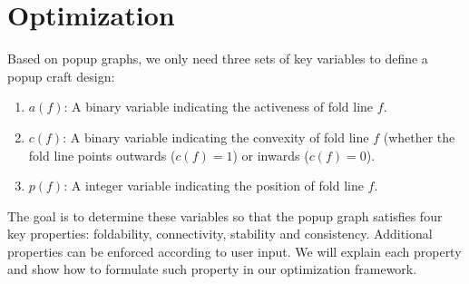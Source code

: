 \section{Optimization}
Based on popup graphs, we only need three sets of key variables to define a popup craft design:
\begin{enumerate}
\item $a(f)$: A binary variable indicating the activeness of fold line $f$.
\item $c(f)$: A binary variable indicating the convexity of fold line $f$ (whether the fold line points outwards ($c(f) = 1$) or inwards ($c(f) = 0$).
\item $p(f)$: A integer variable indicating the position of fold line $f$.
\end{enumerate}

The goal is to determine these variables so that the popup graph satisfies four key properties: foldability, connectivity, stability and consistency. Additional properties can be enforced according to user input. We will explain each property and show how to formulate such property in our optimization framework.




